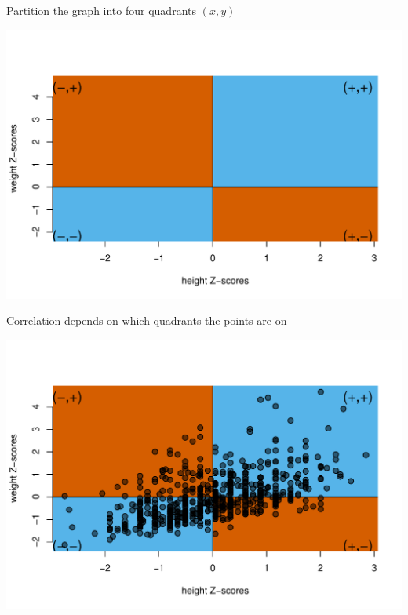 \documentclass[10pt,handout]{beamer}\usepackage[]{graphicx}\usepackage[]{color}
\makeatletter
\def\maxwidth{ %
  \ifdim\Gin@nat@width>\linewidth
    \linewidth
  \else
    \Gin@nat@width
  \fi
}
\newenvironment{knitrout}{}{} %
\makeatother
\begin{document}
\begin{frame}[fragile]{Partition the graph into four quadrants $(x,y)$}
	
\begin{knitrout}\tiny
{}\color{fgcolor}

{\centering \includegraphics[width=\maxwidth]{figure/unnamed-chunk-3-1} 

}



\end{knitrout}
	
\end{frame}


\begin{frame}[fragile]{Correlation depends on which quadrants the points are on}
	
\begin{knitrout}\tiny
{}\color{fgcolor}

{\centering \includegraphics[width=\maxwidth]{figure/unnamed-chunk-4-1} 

}



\end{knitrout}
	
\end{frame}
\end{document}
